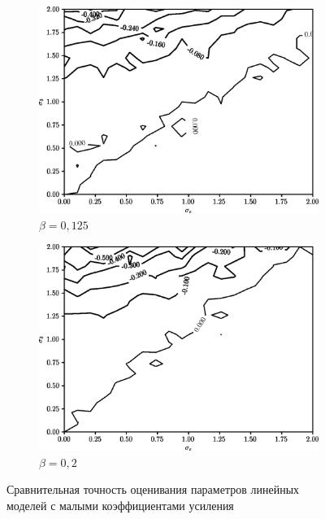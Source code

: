 \begin{figure}[p]
  \begin{subfigure}[b]{\linewidth}
    \centering
    \includegraphics[width=135mm]{fig/linear/param/beta-0,125_param.png}
    \caption{\( \beta = 0{,}125 \)}
  \end{subfigure}

  \vspace{2\baselineskip}
  \begin{subfigure}[b]{\linewidth}
    \centering
    \includegraphics[width=135mm]{fig/linear/param/beta-0,2_param.png}
    \caption{\( \beta = 0{,}2 \)}
  \end{subfigure}

  \vspace{\baselineskip}
  \caption{%
    Сравнительная точность оценивания параметров линейных \\
    моделей с малыми коэффициентами усиления
  }\label{fig:comparison_linear_params_beta-small}
\end{figure}

